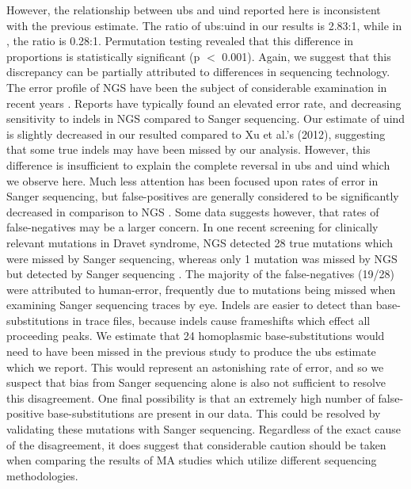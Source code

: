 \documentclass[12pt,twoside]{reedthesis}
\begin{document}
However, the relationship between \gls{ubs} and \gls{uind} reported here is inconsistent with the previous estimate.
The ratio of \gls{ubs}:\gls{uind} in our results is 2.83:1, while in \cite{xu_high_2012}, the ratio is 0.28:1.
Permutation testing revealed that this difference in proportions is statistically significant (p $<$ 0.001).
Again, we suggest that this discrepancy can be partially attributed to differences in sequencing technology. 
The error profile of \gls{NGS} have been the subject of considerable examination in recent years \citep{nakamura_sequence-specific_2011, wang_estimation_2012, wall_estimating_2014, schirmer_insight_2015}.
Reports have typically found an elevated error rate, and decreasing sensitivity to indels in \gls{NGS} compared to Sanger sequencing.
Our estimate of \gls{uind} is slightly decreased in our resulted compared to Xu et al.'s (2012), suggesting that some true indels may have been missed by our analysis.
However, this difference is insufficient to explain the complete reversal in \gls{ubs} and \gls{uind} which we observe here.
Much less attention has been focused upon rates of error in Sanger sequencing, but false-positives are generally considered to be significantly decreased in comparison to \gls{NGS} \citep{shendure_next-generation_2008}.
Some data suggests however, that rates of false-negatives may be a larger concern.
In one recent screening for clinically relevant mutations in Dravet syndrome, \gls{NGS} detected 28 true mutations which were missed by Sanger sequencing, whereas only 1 mutation was missed by \gls{NGS} but detected by Sanger sequencing \citep{djemie_pitfalls_2016}.
The majority of the false-negatives (19/28) were attributed to human-error, frequently due to mutations being missed when examining Sanger sequencing traces by eye.
Indels are easier to detect than base-substitutions in trace files, because indels cause frameshifts which effect all proceeding peaks. 
We estimate that 24 homoplasmic base-substitutions would need to have been missed in the previous study to produce the \gls{ubs} estimate which we report. 
This would represent an astonishing rate of error, and so we suspect that bias from Sanger sequencing alone is also not sufficient to resolve this disagreement.
One final possibility is that an extremely high number of false-positive base-substitutions are present in our data. 
This could be resolved by validating these mutations with Sanger sequencing.
Regardless of the exact cause of the disagreement, it does suggest that considerable caution should be taken when comparing the results of \gls{MA} studies which utilize different sequencing methodologies.
\end{document}
